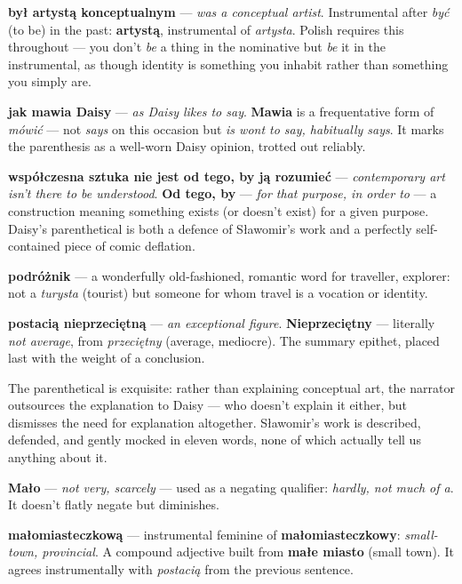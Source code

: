 \textbf{był artystą konceptualnym} --- \textit{was a conceptual
artist}. Instrumental after \textit{być} (to be) in the past:
\textbf{artystą}, instrumental of \textit{artysta}. Polish requires
this throughout --- you don't \textit{be} a thing in the nominative
but \textit{be} it in the instrumental, as though identity is something
you inhabit rather than something you simply are.

\textbf{jak mawia Daisy} --- \textit{as Daisy likes to say}.
\textbf{Mawia} is a frequentative form of \textit{mówić} --- not
\textit{says} on this occasion but \textit{is wont to say, habitually
says}. It marks the parenthesis as a well-worn Daisy opinion, trotted
out reliably.

\textbf{współczesna sztuka nie jest od tego, by ją rozumieć} ---
\textit{contemporary art isn't there to be understood}. \textbf{Od
tego, by} --- \textit{for that purpose, in order to} --- a
construction meaning something exists (or doesn't exist) for a given
purpose. Daisy's parenthetical is both a defence of Sławomir's work
and a perfectly self-contained piece of comic deflation.

\textbf{podróżnik} --- a wonderfully old-fashioned, romantic word for
traveller, explorer: not a \textit{turysta} (tourist) but someone for
whom travel is a vocation or identity.

\textbf{postacią nieprzeciętną} --- \textit{an exceptional figure}.
\textbf{Nieprzeciętny} --- literally \textit{not average}, from
\textit{przeciętny} (average, mediocre). The summary epithet, placed
last with the weight of a conclusion.

The parenthetical is exquisite: rather than explaining conceptual art,
the narrator outsources the explanation to Daisy --- who doesn't
explain it either, but dismisses the need for explanation altogether.
Sławomir's work is described, defended, and gently mocked in eleven
words, none of which actually tell us anything about it.



\textbf{Mało} --- \textit{not very, scarcely} --- used as a negating
qualifier: \textit{hardly, not much of a}. It doesn't flatly negate
but diminishes.

\textbf{małomiasteczkową} --- instrumental feminine of
\textbf{małomiasteczkowy}: \textit{small-town, provincial}. A compound
adjective built from \textbf{małe miasto} (small town). It agrees
instrumentally with \textit{postacią} from the previous sentence.

